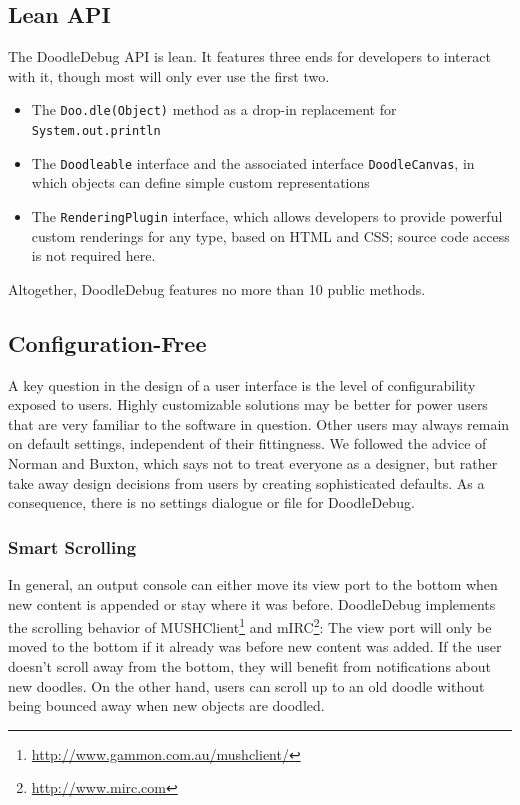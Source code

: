 \documentclass[english]{scrartcl}
\newcommand{\DD}{Dood\-le\-De\-bug\xspace}
\newcommand{\println}{\texttt{Sys\-tem.\-out.\-println}\xspace}
\begin{document}
\subsection{Lean API}
The \DD API is lean.
It features three ends for developers to interact with it, though most will only ever use the first two.
\begin{itemize}
\item The \texttt{Doo.dle(Object)} method as a drop-in replacement for \println
\item The \texttt{Doodleable} interface and the associated interface \texttt{DoodleCanvas}, in which objects can define simple custom representations
\item The \texttt{RenderingPlugin} interface, which allows developers to provide powerful custom renderings for any type, based on HTML and CSS; source code access is not required here.
\end{itemize}
Altogether, \DD features no more than 10 public methods.

\subsection{Configuration-Free}
A key question in the design of a user interface is the level of configurability exposed to users.
Highly customizable solutions may be better for power users that are very familiar to the software in question.
Other users may always remain on default settings, independent of their fittingness.
We followed the advice of Norman\cite{?} and Buxton\cite{?}, which says not to treat everyone as a designer, but rather take away design decisions from users by creating sophisticated defaults.
As a consequence, there is no settings dialogue or file for \DD.

\subsubsection{Smart Scrolling}
In general, an output console can either move its view port to the bottom when new content is appended or stay where it was before.
\DD implements the scrolling behavior of MUSHClient\footnote{\url{http://www.gammon.com.au/mushclient/}} and mIRC\footnote{\url{http://www.mirc.com}}:
The view port will only be moved to the bottom if it already was before new content was added.
If the user doesn't scroll away from the bottom, they will benefit from notifications about new doodles.
On the other hand, users can scroll up to an old doodle without being bounced away when new objects are doodled.
\end{document}
